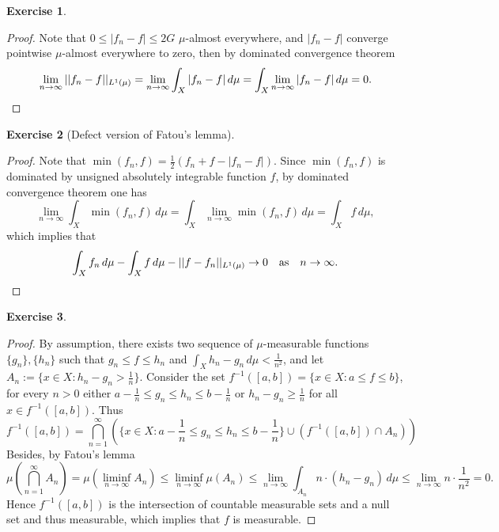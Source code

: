 \documentclass[a4paper]{article}
\newtheorem{ex}{Exercise}[subsection]
\begin{document}
\setcounter{ex}{44}\begin{ex}\end{ex}\begin{proof}
Note that $0 \leq |f_n - f| \leq 2G$ $\mu$-almost everywhere, and $|f_n - f|$ converge pointwise $\mu$-almost everywhere 
to zero, then by dominated convergence theorem\[
\lim_{n \to \infty} ||f_n - f||_{L^1(\mu)} = \lim_{n \to \infty} \int_X |f_n - f|\,d\mu = \int_X \lim_{n \to \infty}
|f_n - f|\,d\mu = 0.\qedhere
\]
\end{proof}

\setcounter{ex}{46}\begin{ex}[Defect version of Fatou’s lemma]\end{ex}\begin{proof}
Note that $\min(f_n, f) = \frac{1}{2}(f_n + f - |f_n - f|)$. Since $\min(f_n, f)$ is dominated by unsigned absolutely 
integrable function $f$, by dominated convergence theorem one has $$
\lim_{n \to \infty} \int_X \min(f_n, f)\,d\mu = \int_X \lim_{n \to \infty} \min(f_n, f)\,d\mu = \int_X f\,d\mu,
$$which implies that \[
\int_X f_n\,d\mu - \int_X f\,d\mu - ||f - f_n||_{L^1(\mu)} \to 0\ \ \ \text{as}\ \ \ n \to \infty. \qedhere    
\]
\end{proof}

\setcounter{ex}{49}\begin{ex}\end{ex}\begin{proof}
By assumption, there exists two sequence of $\mu$-measurable functions $\{g_n\}, \{h_n\}$ such that $g_n \leq f \leq h_n$
and $\int_X h_n - g_n\,d\mu < \frac{1}{n^2}$, and let $A_n := \{x \in X : h_n - g_n > \frac{1}{n}\}$. Consider
the set $f^{-1}([a, b]) = \{x \in X : a \leq f \leq b\}$, for every $n > 0$ either 
$a - \frac{1}{n} \leq g_n \leq h_n \leq b - \frac{1}{n}$ or $h_n - g_n \geq \frac{1}{n}$ for all $x \in f^{-1}([a, b])$.
Thus $$
f^{-1}([a, b]) = \bigcap_{n = 1}^\infty (\{x \in X : a - \frac{1}{n} \leq g_n \leq h_n \leq b - \frac{1}{n}\} \cup
(f^{-1}([a, b]) \cap A_n))
$$Besides, by Fatou’s lemma$$
\mu(\bigcap_{n = 1}^\infty A_n) = \mu(\liminf_{n \to \infty} A_n) \leq \liminf_{n\to\infty} \mu(A_n) \leq 
\lim_{n\to\infty} \int_{A_n} n \cdot (h_n - g_n)\,d\mu \leq \lim_{n\to\infty} n\cdot \frac{1}{n^2} = 0.
$$Hence $f^{-1}([a, b])$ is the intersection of countable measurable sets and a null set and thus measurable, which 
implies that $f$ is measurable.
\end{proof}
\end{document}
